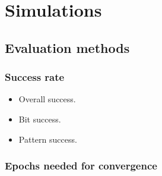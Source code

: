 
\section{Simulations}

 

\subsection{Evaluation methods} 

\subsubsection{Success rate} 

\begin{itemize}
\item Overall success. 
\item Bit success. 
\item Pattern success. 
\end{itemize} 

\subsubsection{Epochs needed for convergence} 


